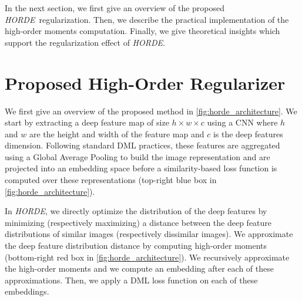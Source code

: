 \documentclass[10pt,twocolumn,letterpaper]{article}
\def\ourmethod{\textit{HORDE}}
\begin{document}
    In the next section, we first give an overview of the proposed \ourmethod \ regularization.
    Then, we describe the practical implementation of the high-order moments computation.
    Finally, we give theoretical insights which support the regularization effect of \ourmethod. 
\section{Proposed High-Order Regularizer}\label{sec:method_overview}
    We first give an overview of the proposed method in \autoref{fig:horde_architecture}.
    We start by extracting a deep feature map of size $h \times w \times c$ using a CNN where $h$ and $w$ are the height and width of the feature map and $c$ is the deep features dimension.
    Following standard DML practices, these features are aggregated using a Global Average Pooling to build the image representation and are projected into an embedding space before a similarity-based loss function is computed over these representations (top-right blue box in \autoref{fig:horde_architecture}).


    In \ourmethod, we directly optimize the distribution of the deep features by minimizing (respectively maximizing) a distance between the deep feature distributions of similar images (respectively dissimilar images).
    We approximate the deep feature distribution distance by computing high-order moments (bottom-right red box in \autoref{fig:horde_architecture}).
    We recursively approximate the high-order moments and we compute an embedding after each of these approximations.
Then, we apply a DML loss function on each of these embeddings.
    
\end{document}
